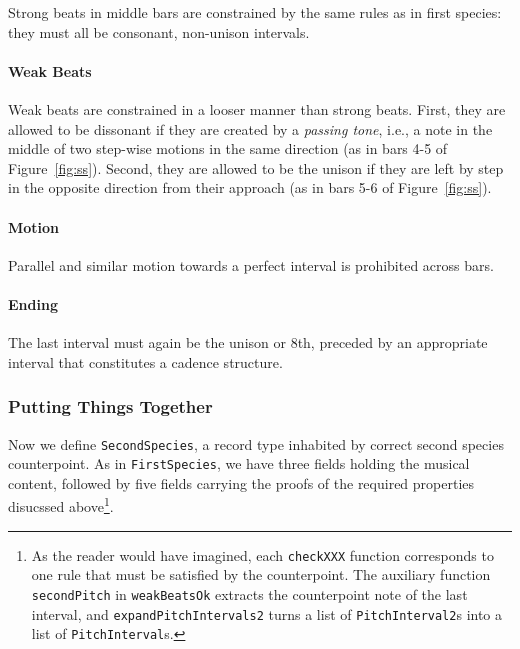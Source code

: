 Strong beats in middle bars are constrained by the same rules as in
first species: they must all be consonant, non-unison intervals.

\paragraph{Weak Beats}

Weak beats are constrained in a looser manner than strong beats.
First, they are allowed to be dissonant if they are created by a
\emph{passing tone}, i.e., a note in the middle of two step-wise
motions in the same direction (as in bars 4-5 of Figure~\ref{fig:ss}).
Second, they are allowed to be the unison if they are left by step in
the opposite direction from their approach (as in bars 5-6 of
Figure~\ref{fig:ss}).

\paragraph{Motion}

Parallel and similar motion towards a perfect interval is prohibited
across bars.

\paragraph{Ending}

The last interval must again be the unison or 8th, preceded by an
appropriate interval that constitutes a cadence structure.

\subsubsection{Putting Things Together}

Now we define \texttt{SecondSpecies}, a record type inhabited by
correct second species counterpoint.
As in \texttt{FirstSpecies}, we have three fields holding the musical
content, followed by five fields carrying the proofs of the required
properties disucssed above\footnote{
  As the reader would have imagined, each \texttt{checkXXX} function
  corresponds to one rule that must be satisfied by the counterpoint.
  The auxiliary function \texttt{secondPitch} in \texttt{weakBeatsOk}
  extracts the counterpoint note of the last interval, and
  \texttt{expandPitchIntervals2} turns a list of \texttt{PitchInterval2}s
  into a list of \texttt{PitchInterval}s.
}.

